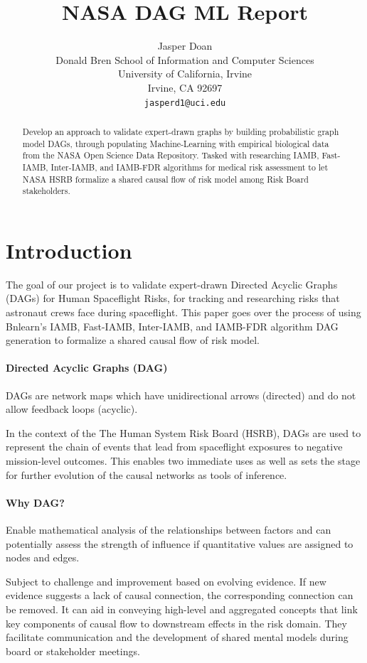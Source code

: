 \documentclass{article}
\title{NASA DAG ML Report}
\author{
  Jasper Doan \\
  Donald Bren School of Information and Computer Sciences\\
  University of California, Irvine\\
  Irvine, CA 92697 \\
  \texttt{jasperd1@uci.edu} \\
}
\begin{document}
\maketitle
\begin{abstract}
Develop an approach to validate expert-drawn graphs by building probabilistic graph model DAGs, through populating Machine-Learning with empirical biological data from the NASA Open Science Data Repository. Tasked with researching IAMB, Fast-IAMB, Inter-IAMB, and IAMB-FDR algorithms for medical risk assessment to let NASA HSRB formalize a shared causal flow of risk model among Risk Board stakeholders. 
\end{abstract}




\section{Introduction}
The goal of our project is to validate expert-drawn Directed Acyclic Graphs (DAGs) for Human Spaceflight Risks, for tracking and researching risks that astronaut crews face during spaceflight.
This paper goes over the process of using Bnlearn's IAMB, Fast-IAMB, Inter-IAMB, and IAMB-FDR algorithm DAG generation to formalize a shared causal flow of risk model. 

\paragraph{Directed Acyclic Graphs (DAG)}
DAGs are network maps which have unidirectional arrows (directed) and do not allow feedback loops (acyclic). 

In the context of the The Human System Risk Board (HSRB), DAGs are used to represent the chain of events that lead from spaceflight exposures to negative mission-level outcomes. This enables two immediate uses as well as sets the stage for further evolution of the causal networks as tools of inference.

\paragraph{Why DAG?}
Enable mathematical analysis of the relationships between factors and can potentially assess the strength of influence if quantitative values are assigned to nodes and edges.

Subject to challenge and improvement based on evolving evidence. If new evidence suggests a lack of causal connection, the corresponding connection can be removed.
It can aid in conveying high-level and aggregated concepts that link key components of causal flow to downstream effects in the risk domain.
They facilitate communication and the development of shared mental models during board or stakeholder meetings.
\end{document}
